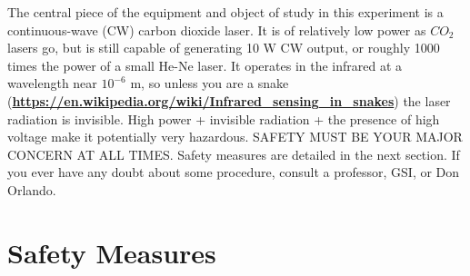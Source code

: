 \documentclass{../lab}
\begin{document}
The central piece of the equipment and object of study in this experiment is a continuous-wave (CW) carbon dioxide laser. It is of relatively low power as $CO_2 $ lasers go, but is still capable of generating 10 W CW output, or roughly 1000 times the power of a small He-Ne laser. It operates in the infrared at a wavelength near $10^{-6}$ m, so unless you are a snake (\href{https://en.wikipedia.org/wiki/Infrared\_sensing\_in\_snakes}{\textbf{https://en.wikipedia.org/wiki/Infrared\_sensing\_in\_snakes}}​) the laser radiation is invisible. High power + invisible radiation + the presence of high voltage make it potentially very hazardous. SAFETY MUST BE YOUR MAJOR CONCERN AT ALL TIMES. Safety measures are detailed in the next section. If you ever have any doubt about some procedure, consult a professor, GSI, or Don Orlando.

\section{Safety Measures}
\end{document}
